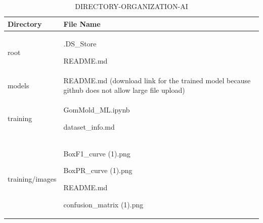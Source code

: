 \documentclass[conference]{IEEEtran}
\begin{document}
\begin{table}[h]
\caption{DIRECTORY-ORGANIZATION-AI}
\def\arraystretch{1.24} \small
    \begin{tabular}{|p{3.9cm}|p{4cm}|}
    \hline
        Directory & File Name \\ \hline
        root \par   & \par .DS\_Store \par README.md
        \\ \hline

        models \par   & \par README.md (download link for the trained model because github does not allow large file upload)
        \\ \hline

        training \par   & \par GomMold\_ML.ipynb \par dataset\_info.md
        \\ \hline

        training/images \par   & \par BoxF1\_curve (1).png \par BoxPR\_curve (1).png \par README.md \par confusion\_matrix (1).png
        \\ \hline
        
    \end{tabular}
\end{table}

\clearpage
\end{document}
